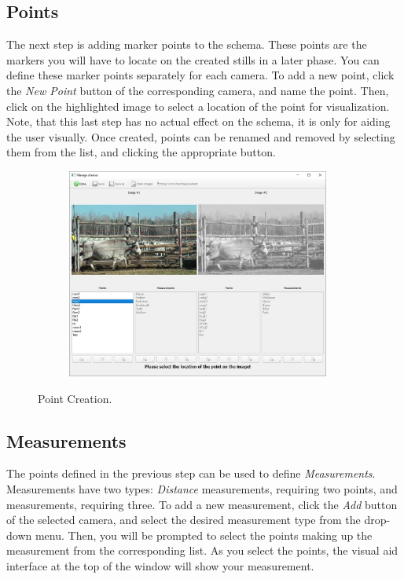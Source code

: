 \documentclass[10pt,a4paper,oneside]{report}             %
\newcommand*{\img}[1]{%
	\raisebox{-.02\baselineskip}{%
		\texttt{[image: \#1]}%
	}%
}
\begin{document}
\subsection{Points}

The next step is adding marker points to the schema. These points are the markers you will have to locate on the created stills in a later phase. You can define these marker points separately for each camera. To add a new point, click the \textit{New Point} \img{../VAM/Icons/1462036180_list-add.png} button of the corresponding camera, and name the point. Then, click on the highlighted image to select a location of the point for visualization. Note, that this last step has no actual effect on the schema, it is only for aiding the user visually. Once created, points can be renamed and removed by selecting them from the list, and clicking the appropriate button.

\begin{figure}[H]
	\centering
	\begin{subfigure}{\textwidth}
		\centering 
		\includegraphics[width=0.95\textwidth]{./images/SchemPoint.jpg}
	\end{subfigure}
	\caption[]
	{\small  Point Creation.}
\end{figure} 

\subsection{Measurements}

The points defined in the previous step can be used to define \textit{Measurements}. Measurements have two types: \textit{Distance} measurements, requiring two points, and  measurements, requiring three. To add a new measurement, click the \textit{Add} \img{../VAM/Icons/1462036180_list-add.png} button of the selected camera, and select the desired measurement type from the drop-down menu. Then, you will be prompted to select the points making up the measurement from the corresponding list. As you select the points, the visual aid interface at the top of the window will show your measurement. 
\end{document}
